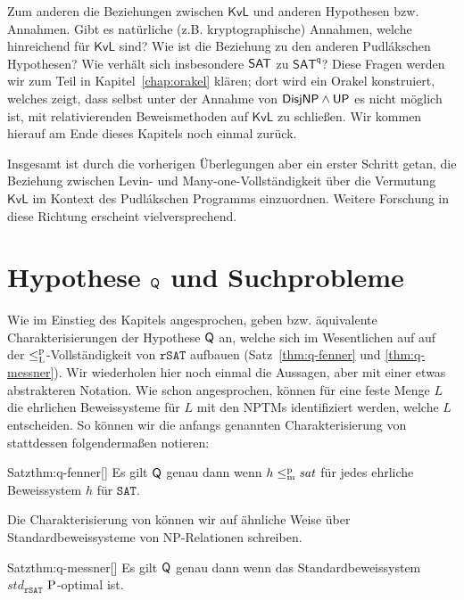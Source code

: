 Zum anderen die Beziehungen zwischen $\mathsf{KvL}$ und anderen Hypothesen bzw. Annahmen.
Gibt es natürliche (z.B. kryptographische) Annahmen, welche hinreichend für $\mathsf{KvL}$ sind? Wie ist die Beziehung zu den anderen Pudlákschen Hypothesen? Wie verhält sich insbesondere $\hSAT$ zu $\mathsf{SAT^{q}}$? 
Diese Fragen werden wir zum Teil in Kapitel~\ref{chap:orakel} klären; dort wird ein Orakel konstruiert, welches zeigt, dass selbst unter der Annahme von $\hDisjNP\land\hUP$ es nicht möglich ist, mit relativierenden Beweismethoden auf $\mathsf{KvL}$ zu schließen.
Wir kommen hierauf am Ende dieses Kapitels noch einmal zurück.

Insgesamt ist durch die vorherigen Überlegungen aber ein erster Schritt getan, die Beziehung zwischen Levin- und Many-one-Vollständigkeit über die Vermutung $\mathsf{KvL}$ im Kontext des Pudlákschen Programms einzuordnen.
Weitere Forschung in diese Richtung erscheint vielversprechend.

\section{Hypothese $\hQ$ und Suchprobleme}\label{sec:q-vs-search}

Wie im Einstieg des Kapitels angesprochen, geben \textcite{fenner_inverting_2003} bzw. \textcite{kobler_is_2000} äquivalente Charakterisierungen der Hypothese $\hQ$ an, welche sich im Wesentlichen auf auf der $\leqlp$-Vollständigkeit von $\mathtt{rSAT}$ aufbauen (Satz~\ref{thm:q-fenner} und \ref{thm:q-messner}).
Wir wiederholen hier noch einmal die Aussagen, aber mit einer etwas abstrakteren Notation.
Wie schon angesprochen, können für eine feste Menge $L$ die ehrlichen Beweissysteme für $L$ mit den NPTMs identifiziert werden, welche $L$ entscheiden.
So können wir die anfangs genannten Charakterisierung von \citeauthor{fenner_inverting_2003} stattdessen folgendermaßen notieren:
\begin{reptheorem}{Satz}{thm:q-fenner}[\cite{fenner_inverting_2003}]
    Es gilt $\hQ$ genau dann wenn $h\leqmp\mathit{sat}$ für jedes ehrliche Beweissystem $h$ für $\mathtt{SAT}$. 
\end{reptheorem}
Die Charakterisierung von \citeauthor{kobler_is_2000} können wir auf ähnliche Weise über Standardbeweissysteme von NP-Relationen schreiben.
\begin{reptheorem}{Satz}{thm:q-messner}[\cite{kobler_is_2000}]
    Es gilt $\hQ$ genau dann wenn das Standardbeweissystem $\mathit{std}_\mathtt{rSAT}$ $\P$-optimal ist.
\end{reptheorem}

